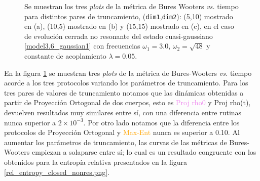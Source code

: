 \documentclass{report} %
\numberwithin{equation}{section}
\begin{document}
\begin{figure}
\caption{Se muestran los tres \textit{plots} de la métrica de Bures Wooters \textit{vs.} tiempo para distintos pares de truncamiento, (\texttt{dim1},\texttt{dim2}): (5,10) mostrado en (a), (10,5) mostrado en (b) y (15,15) mostrado en (c), en el caso de evolución cerrada no resonante del estado cuasi-gaussiano \eqref{model3.6_gaussian1} con frecuencias $\omega_1 = 3.0$,  $\omega_2 =\sqrt{48}$ y constante de acoplamiento $\lambda = 0.05$.}
\label{closed_n_nr}
\end{figure}

En la figura \ref{closed_n_nr} se muestran tres \textit{plots} de la métrica de Bures-Wooters \textit{vs.} tiempo acorde a los tres protocolos variando los parámetros de truncamiento. Para los tres pares de valores de truncamiento notamos que las dinámicas obtenidas a partir de Proyección Ortogonal de dos cuerpos, esto es \textcolor{violet}{Proj rho0} y \textcolor{awesome}{Proj rho(t)}, devuelven resultados muy similares entre sí, con una diferencia entre rutinas nunca superior a $2 \times 10^{-3}$. Por otro lado notamos que la diferencia entre los protocolos de Proyección Ortogonal y \textcolor{orange}{Max-Ent} nunca es superior a 0.10. Al aumentar los parámetros de truncamiento, las curvas de las métricas de Bures-Wooters empiezan a solaparse entre sí; lo cual es un resultado congruente con los obtenidos para la entropía relativa presentados en la figura \ref{rel_entropy_closed_nonres.png}.
\end{document}
